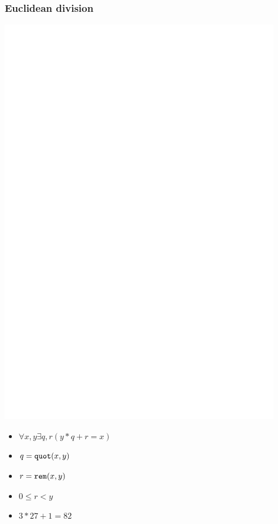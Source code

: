 \documentclass{beamer}
\begin{document}
\begin{frame}[fragile]
\frametitle{Euclidean division}
\begin{minipage}{0.4\textwidth}
\includegraphics[width=0.9\textwidth]{diagrams/euclidean_division_negated.png}\\
\end{minipage}
\begin{minipage}{0.5\textwidth}
\begin{itemize}
\item $\forall x, y \exists q, r (y*q + r = x)$
\item $q = \verb|quot|(x, y)$
\item $r = \verb|rem|(x, y)$
\item $0 \le r < y$
\item $3 * 27 + 1 = 82$
\end{itemize}
\end{minipage}
\end{frame}
\end{document}
